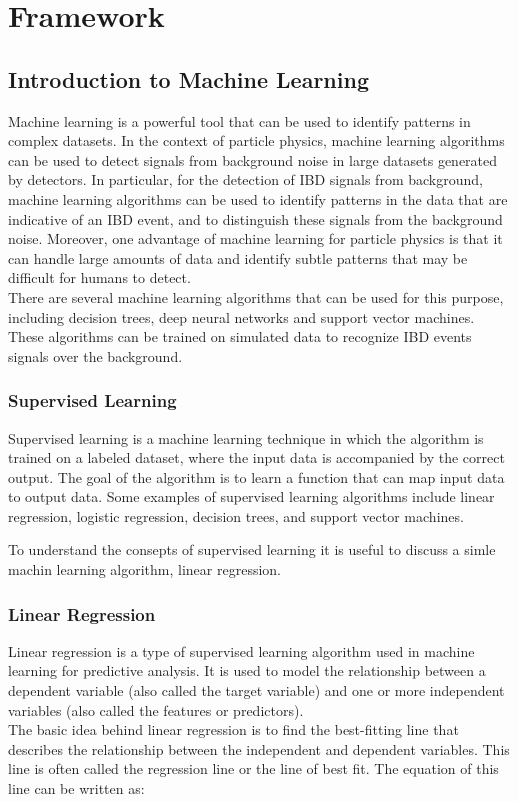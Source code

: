 \chapter{Framework}
\section{Introduction to Machine Learning}

Machine learning is a powerful tool that can be used to identify patterns in complex datasets. In the context of particle physics, machine learning algorithms can be used to detect signals from background noise in large datasets generated by detectors. In particular, for the detection of IBD signals from background, machine learning algorithms can be used to identify patterns in the data that are indicative of an IBD event, and to distinguish these signals from the background noise. Moreover, one advantage of machine learning for particle physics is that it can handle large amounts of data and identify subtle patterns that may be difficult for humans to detect.
\\

There are several machine learning algorithms that can be used for this purpose, including decision trees, deep neural networks and support vector machines. These algorithms can be trained on simulated data to recognize IBD events signals over the background. 


\subsection{Supervised Learning}

Supervised learning is a machine learning technique in which the algorithm is trained on a labeled dataset, where the input data is accompanied by the correct output. The goal of the algorithm is to learn a function that can map input data to output data. Some examples of supervised learning algorithms include linear regression, logistic regression, decision trees, and support vector machines.

To understand the consepts of supervised learning it is useful to discuss a simle machin learning algorithm, linear regression. 

\subsection{Linear Regression}
Linear regression is a type of supervised learning algorithm used in machine learning for predictive analysis. It is used to model the relationship between a dependent variable (also called the target variable) and one or more independent variables (also called the features or predictors).
\\
The basic idea behind linear regression is to find the best-fitting line that describes the relationship between the independent and dependent variables. This line is often called the regression line or the line of best fit. The equation of this line can be written as:

